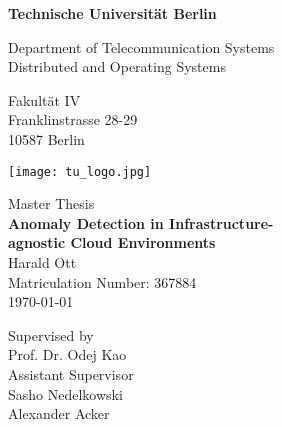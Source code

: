 \thispagestyle{empty}
\begin{center}

\vspace*{1.4cm}
{\LARGE \textbf{Technische Universit\"at Berlin}}

\vspace{0.5cm}

{\large Department of Telecommunication Systems\\[1mm]}
{\large Distributed and Operating Systems\\[5mm]}

Fakult\"at IV\\
Franklinstrasse 28-29\\
10587 Berlin\\

\vspace*{1cm}

\texttt{[image: tu\_logo.jpg]}

\vspace*{1.0cm}

{\LARGE Master Thesis}\\

\vspace{1.0cm}
{\LARGE \textbf{Anomaly Detection in Infrastructure-}}\\
\vspace*{0.3cm}
{\LARGE \textbf{agnostic Cloud Environments}}\\
\vspace*{1.0cm}
{\LARGE Harald Ott}
\\
\vspace*{0.5cm}
Matriculation Number: 367884\\
\today\\ %
\vspace*{1.0cm}

Supervised by\\
Prof. Dr. Odej Kao\\
\vspace*{0.5cm}
Assistant Supervisor\\
Sasho Nedelkowski\\
Alexander Acker
\vspace{3cm}


\end{center}

